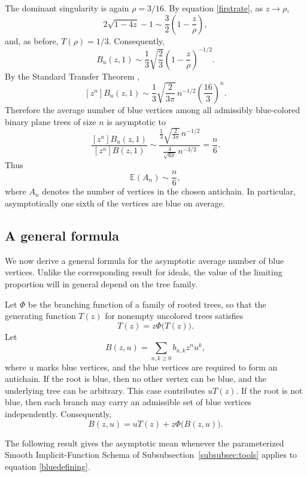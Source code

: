 \documentclass[10pt,a4paper]{amsart}
\theoremstyle{remark}
\begin{document}
The dominant singularity is again $\rho=3/16$.
By equation \eqref{firstrate}, as $z\to\rho$,
\[
2\sqrt{1-4z}-1
\sim
\frac32\left(1-\frac{z}{\rho}\right),
\]
and, as before,
$T(\rho)=1/3$.
Consequently,
\[
B_u(z,1)
\sim
\frac13\sqrt{\frac23}
\left(1-\frac{z}{\rho}\right)^{-1/2}.
\]
By the Standard Transfer Theorem \cite[Corollary VI.1]{FlajoletSedgewick},
\[
[z^n]B_u(z,1)
\sim
\frac13\sqrt{\frac{2}{3\pi}}\,
 n^{-1/2}\left(\frac{16}{3}\right)^n.
\]
Therefore the average number of blue vertices among all admissibly blue-colored binary plane trees of size $n$ is asymptotic to
\[
\frac{[z^n]B_u(z,1)}{[z^n]B(z,1)}
\sim
\frac{
\frac13\sqrt{\frac{2}{3\pi}}\,n^{-1/2}
}{
\frac{4}{\sqrt{6\pi}}\,n^{-3/2}
}
=
\frac{n}{6}.
\]
Thus
\[
{
\mathbb E(A_n)\sim \frac{n}{6},
}
\]
where $A_n$ denotes the number of vertices in the chosen antichain.  In particular, asymptotically one sixth of the vertices are blue on average.



\subsection{A general formula}

We now derive a general formula for the asymptotic average number of blue
vertices. Unlike the corresponding result for ideals, the value of the
limiting proportion will in general depend on the tree family.

Let $\Phi$ be the branching function of a family of rooted trees, so that
the generating function $T(z)$ for nonempty uncolored trees satisfies
\begin{equation}\label{blueT}
T(z)=z\Phi\big(T(z)\big).
\end{equation}
Let
\[
B(z,u)=\sum_{n,k\geq 0} b_{n,k}z^n u^k,
\]
where $u$ marks blue vertices, and the blue vertices are required to form an
antichain.  If the root is blue, then no other vertex can be blue, and the
underlying tree can be arbitrary.  This case contributes $uT(z)$.  If the
root is not blue, then each branch may carry an admissible set of blue
vertices independently.  Consequently,
\begin{equation}\label{bluedefining}
B(z,u)=uT(z)+z\Phi\big(B(z,u)\big).
\end{equation}

The following result gives the asymptotic mean whenever the parameterized
Smooth Implicit-Function Schema of Subsubsection~\ref{subsubsec:tools}
applies to equation \eqref{bluedefining}.
\end{document}
